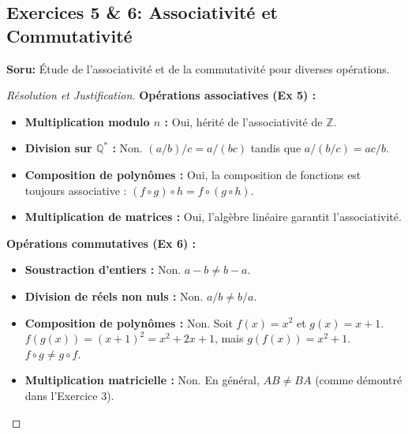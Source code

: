 \documentclass[12pt,a4paper]{report}
\begin{document}
\subsection*{Exercices 5 \& 6: Associativité et Commutativité}
\textbf{Soru:} Étude de l'associativité et de la commutativité pour diverses opérations.
\begin{proof}[Résolution et Justification]
\textbf{Opérations associatives (Ex 5) :}
\begin{itemize}
    \item \textbf{Multiplication modulo $n$ :} Oui, hérité de l'associativité de $\mathbb{Z}$.
    \item \textbf{Division sur $\mathbb{Q}^*$ :} Non. $(a/b)/c = a/(bc)$ tandis que $a/(b/c) = ac/b$.
    \item \textbf{Composition de polynômes :} Oui, la composition de fonctions est toujours associative : $(f \circ g) \circ h = f \circ (g \circ h)$.
    \item \textbf{Multiplication de matrices :} Oui, l'algèbre linéaire garantit l'associativité.
\end{itemize}
\textbf{Opérations commutatives (Ex 6) :}
\begin{itemize}
    \item \textbf{Soustraction d'entiers :} Non. $a - b \neq b - a$.
    \item \textbf{Division de réels non nuls :} Non. $a / b \neq b / a$.
    \item \textbf{Composition de polynômes :} Non. Soit $f(x) = x^2$ et $g(x) = x+1$. $f(g(x)) = (x+1)^2 = x^2+2x+1$, mais $g(f(x)) = x^2+1$. $f \circ g \neq g \circ f$.
    \item \textbf{Multiplication matricielle :} Non. En général, $AB \neq BA$ (comme démontré dans l'Exercice 3).
\end{itemize}
\end{proof}
\end{document}
